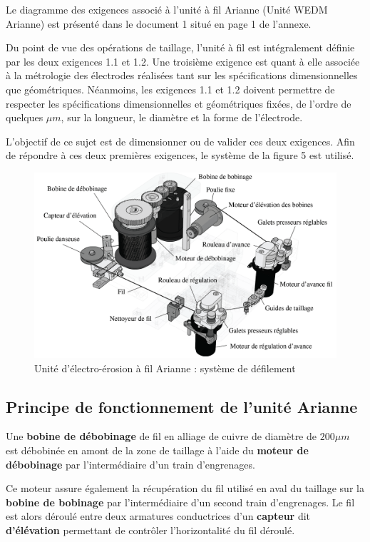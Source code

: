 Le diagramme des exigences associé à l'unité à fil Arianne (Unité WEDM Arianne) est présenté dans le document 1 situé en page 1 de l'annexe.

Du point de vue des opérations de taillage, l'unité à fil est intégralement définie par les deux exigences 1.1 et 1.2. Une troisième exigence est quant à elle associée à la métrologie des électrodes réalisées tant sur les spécifications dimensionnelles que géométriques. Néanmoins, les exigences 1.1 et 1.2 doivent permettre de respecter les spécifications dimensionnelles et géométriques fixées, de l'ordre de quelques $\mu m$, sur la longueur, le diamètre et la forme de l'électrode.

L'objectif de ce sujet est de dimensionner ou de valider ces deux exigences. Afin de répondre à ces deux premières exigences, le système de la figure 5 est utilisé.

\begin{figure}[!h]
 \centering\includegraphics[width=0.9\linewidth]{img/img05}
 \caption{Unité d'électro-érosion à fil Arianne : système de défilement}
 \label{img05}
\end{figure}

\subsection{Principe de fonctionnement de l'unité Arianne}

Une \textbf{bobine de débobinage} de fil en alliage de cuivre de diamètre de $200\mu m$ est débobinée en amont de la zone de taillage à l'aide du \textbf{moteur de débobinage} par l'intermédiaire d'un train d'engrenages.

Ce moteur assure également la récupération du fil utilisé en aval du taillage sur la \textbf{bobine de bobinage} par l'intermédiaire d'un second train d'engrenages. Le fil est alors déroulé entre deux armatures conductrices d'un \textbf{capteur} dit \textbf{d'élévation} permettant de contrôler l'horizontalité du fil déroulé.

